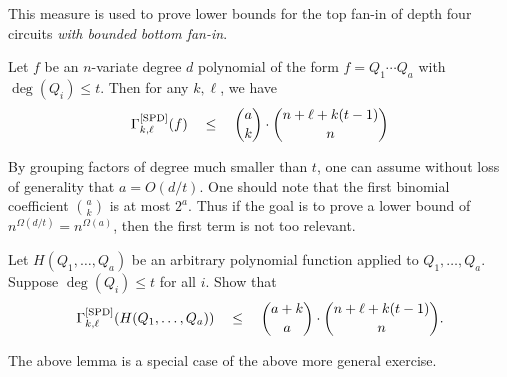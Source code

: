 
This measure is used to prove lower bounds for the top fan-in of depth four circuits \emph{with bounded bottom fan-in}. 

\begin{lemma*}
Let $f$ be an $n$-variate degree $d$ polynomial of the form $f = Q_1 \cdots Q_a$ with $\deg(Q_i) \leq t$. Then for any $k,\ell$, we have
\[
\Gamma^{\mathrm{[SPD]}}_{k,\ell}(f) \quad \leq \quad \binom{a}{k} \cdot \binom{n + \ell + k(t-1)}{n}
\]
\end{lemma*}

By grouping factors of degree much smaller than $t$, one can assume without loss of generality that $a = O(d/t)$.
One should note that the first binomial coefficient $\binom{a}{k}$ is at most $2^a$.
Thus if the goal is to prove a lower bound of $n^{\Omega(d/t)} = n^{\Omega(a)}$, then the first term is not too relevant. \\

\begin{exercise}
Let $H(Q_1,\ldots, Q_a)$ be an arbitrary polynomial function applied to $Q_1,\ldots, Q_a$. Suppose $\deg(Q_i) \leq t$ for all $i$. Show that
\[
\Gamma^{\mathrm{[SPD]}}_{k,\ell}(H(Q_1,\ldots, Q_a)) \quad \leq \quad \binom{a+k}{a} \cdot \binom{n + \ell + k(t-1)}{n}.
\]
\end{exercise}

The above lemma is a special case of the above more general exercise. 

